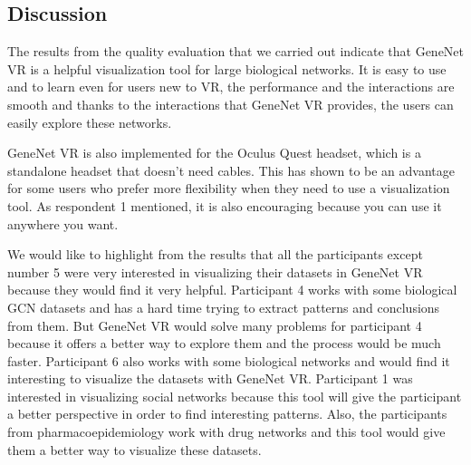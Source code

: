 \subsection{Discussion}
The results from the quality evaluation that we carried out indicate that GeneNet VR is a helpful visualization tool for large biological networks. It is easy to use and to learn even for users new to VR, the performance and the interactions are smooth and thanks to the interactions that GeneNet VR provides, the users can easily explore these networks.

GeneNet VR is also implemented for the Oculus Quest headset, which is a standalone headset that doesn't need cables. This has shown to be an advantage for some users who prefer more flexibility when they need to use a visualization tool. As respondent 1 mentioned, it is also encouraging because you can use it anywhere you want.

We would like to highlight from the results that all the participants except number 5 were very interested in visualizing their datasets in GeneNet VR because they would find it very helpful. Participant 4 works with some biological GCN datasets and has a hard time trying to extract patterns and conclusions from them. But GeneNet VR would solve many problems for participant 4 because it offers a better way to explore them and the process would be much faster. Participant 6 also works with some biological networks and would find it interesting to visualize the datasets with GeneNet VR. Participant 1 was interested in visualizing social networks because this tool will give the participant a better perspective in order to find interesting patterns. Also, the participants from pharmacoepidemiology work with drug networks and this tool would give them a better way to visualize these datasets.


